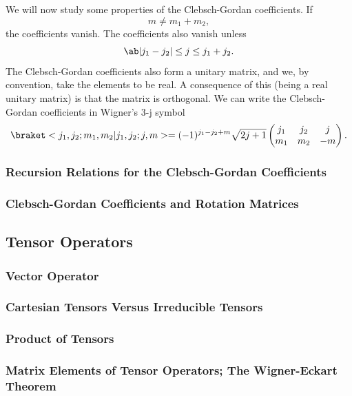 We will now study some properties of the Clebsch-Gordan coefficients. If
\begin{equation}
    m \neq m_1 + m_2,
\end{equation}
the coefficients vanish. The coefficients also vanish unless
\begin{equation}
    \abs{j_1 - j_2} \leq j \leq j_1 + j_2.
\end{equation}
The Clebsch-Gordan coefficients also form a unitary matrix, and we, by convention, take the elements to be real. A consequence of this (being a real unitary matrix) is that the matrix is orthogonal. We can write the Clebsch-Gordan coefficients in Wigner's 3-j symbol
\begin{equation}
    \bk{j_1, j_2; m_1, m_2}{j_1, j_2; j, m} = (-1)^{j_1 - j_2 + m} \sqrt{2j + 1}
    \begin{pmatrix}
        j_1 & j_2 & j\\
        m_1 & m_2 & -m
    \end{pmatrix}.
\end{equation}



\subsubsection{Recursion Relations for the Clebsch-Gordan Coefficients}




\subsubsection{Clebsch-Gordan Coefficients and Rotation Matrices}

\subsection{Tensor Operators}

\subsubsection{Vector Operator}



\subsubsection{Cartesian Tensors Versus Irreducible Tensors}




\subsubsection{Product of Tensors}



\subsubsection{Matrix Elements of Tensor Operators; The Wigner-Eckart Theorem}


